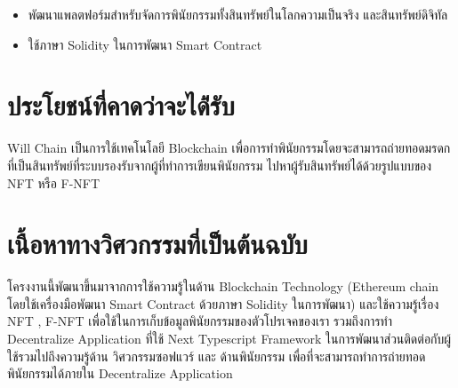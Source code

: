 \documentclass[12pt,oneside,openright,a4paper]{cpe-thai-project}
\begin{document}
\begin{itemize}
\item พัฒนาแพลตฟอร์มสำหรับจัดการพินัยกรรมทั้งสินทรัพย์ในโลกความเป็นจริง และสินทรัพย์ดิจิทัล
\item ใช้ภาษา Solidity ในการพัฒนา Smart Contract
\end{itemize}

\section{ประโยชน์ที่คาดว่าจะได้่รับ}
\tab Will Chain เป็นการใช้เทคโนโลยี Blockchain เพื่อการทำพินัยกรรมโดยจะสามารถถ่ายทอดมรดกที่เป็นสินทรัพย์ที่ระบบรองรับจากผู้ที่ทำการเขียนพินัยกรรม ไปหาผู้รับสินทรัพย์ได้ด้วยรูปแบบของ NFT หรือ F-NFT
\section{เนื้อหาทางวิศวกรรมที่เป็นต้นฉบับ}
\tab โครงงานนี้พัฒนาขึ้นมาจากการใช้ความรู้ในด้าน Blockchain Technology (Ethereum chain โดยใช้เครื่องมือพัฒนา Smart Contract ด้วยภาษา Solidity ในการพัฒนา)  และใช้ความรู้เรื่อง NFT , F-NFT เพื่อใช้ในการเก็บข้อมูลพินัยกรรมของตัวโปรเจคของเรา รวมถึงการทำ Decentralize  Application ที่ใช้ Next Typescript Framework ในการพัฒนาส่วนติดต่อกับผู้ใช้รวมไปถึงความรู้ด้าน วิศวกรรมซอฟแวร์ และ ด้านพินัยกรรม เพื่อที่จะสามารถทำการถ่ายทอดพินัยกรรมได้ภายใน Decentralize  Application
\end{document}
